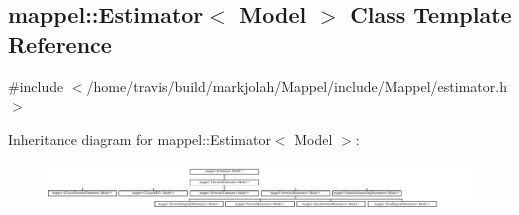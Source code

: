 \hypertarget{classmappel_1_1Estimator}{}\subsection{mappel\+:\+:Estimator$<$ Model $>$ Class Template Reference}
\label{classmappel_1_1Estimator}


{\ttfamily \#include $<$/home/travis/build/markjolah/\+Mappel/include/\+Mappel/estimator.\+h$>$}

Inheritance diagram for mappel\+:\+:Estimator$<$ Model $>$\+:\begin{figure}[H]
\begin{center}
\leavevmode
\includegraphics[height=1.274175cm]{classmappel_1_1Estimator}
\end{center}
\end{figure}
